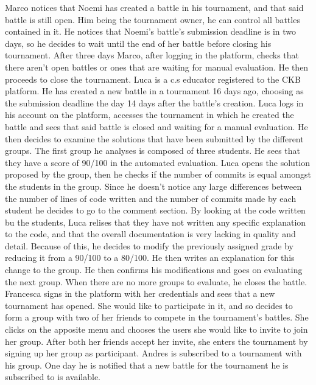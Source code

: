 \documentclass{article}
\newcounter{subsubsubsection}[subsubsection]
\begin{document}
{Marco notices that Noemi has created a battle in his tournament, and that said battle is still open.
Him being the tournament owner, he can control all battles contained in it. 
He notices that Noemi's battle's submission deadline is in two days, so he decides to wait until the end of her battle before closing his tournament.
After three days Marco, after logging in the platform, checks that there aren't open battles or ones that are waiting for manual evaluation. 
He then proceeds to close the tournament.
Luca is a c.s educator registered to the CKB platform. 
He has created a new battle in a tournament 16 days ago, choosing as the submission deadline the day 14 days after the battle's creation.
Luca logs in his account on the platform, accesses the tournament in which he created the battle and sees that said battle is closed and waiting for a manual evaluation.
He then decides to examine the solutions that have been submitted by the different groups.
The first group he analyses is composed of three students. He sees that they have a score of 90/100 in the automated evaluation. 
Luca opens the solution proposed by the group, then he checks if the number of commits is equal amongst the students in the group.
Since he doesn't notice any large differences between the number of lines of code written and the number of commits made by each student he decides to go to the comment section.
By looking at the code written bu the students, Luca relises that they have not written any specific explanation to the code, and that the overall documentation is very lacking 
in quality and detail. 
Because of this, he decides to modify the previously assigned grade by reducing it from a 90/100 to a 80/100.
He then writes an explanation for this change to the group. 
He then confirms his modifications and goes on evaluating the next group.
When there are no more groups to evaluate, he closes the battle.
Francesca signs in the platform with her credentials and sees that a new tournament has opened. 
She would like to participate in it, and so decides to form a group with two of her friends to compete in the tournament's battles. 
She clicks on the apposite menu and chooses the users she would like to invite to join her group.
After both her friends accept her invite, she enters the tournament by signing up her group as participant.
Andres is subscribed to a tournament with his group. One day he is notified that a new battle for the tournament he is subscribed to is available.
}
\end{document}
